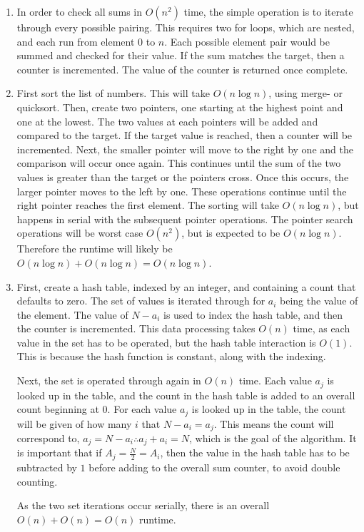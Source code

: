 \documentclass{article}
\begin{document}
\begin{enumerate}
    \item In order to check all sums in $O(n^2)$ time, the simple operation is to iterate through every possible pairing.
        This requires two for loops, which are nested, and each run from element $0$ to $n$.
        Each possible element pair would be summed and checked for their value.
        If the sum matches the target, then a counter is incremented. The value of the counter is returned once complete.

    \item First sort the list of numbers. This will take $O(n\log n)$, using merge- or quicksort.
        Then, create two pointers, one starting at the highest point and one at the lowest.
        The two values at each pointers will be added and compared to the target.
        If the target value is reached, then a counter will be incremented.
        Next, the smaller pointer will move to the right by one and the comparison will occur once again.
        This continues until the sum of the two values is greater than the target or the pointers cross.
        Once this occurs, the larger pointer moves to the left by one.
        These operations continue until the right pointer reaches the first element.
        The sorting will take $O(n\log n)$, but happens in serial with the subsequent pointer operations.
        The pointer search operations will be worst case $O(n^2)$, but is expected to be $O(n\log n)$.
        Therefore the runtime will likely be $O(n\log n) + O(n\log n) = O(n\log n)$.

    \item First, create a hash table, indexed by an integer, and containing a count that defaults to zero.
        The set of values is iterated through for $a_i$ being the value of the element.
        The value of $N-a_i$ is used to index the hash table, and then the counter is incremented.
        This data processing takes $O(n)$ time, as each value in the set has to be operated,
        but the hash table interaction is $O(1)$.
        This is because the hash function is constant, along with the indexing.
        
        Next, the set is operated through again in $O(n)$ time. Each value $a_j$ is looked up in the table,
        and the count in the hash table is added to an overall count beginning at $0$.
        For each value $a_j$ is looked up in the table, the count will be given of how many $i$ that $N-a_i=a_j$.
        This means the count will correspond to, $a_j=N-a_i \therefore a_j+a_i=N$, which is the goal of the algorithm.
        It is important that if $A_j = \frac{N}{2} = A_i$, then the value in the hash table has to be subtracted by $1$ before adding to the overall sum counter, to avoid double counting.
        
        As the two set iterations occur serially, there is an overall $O(n) + O(n) = O(n)$ runtime.
\end{enumerate}
\end{document}
